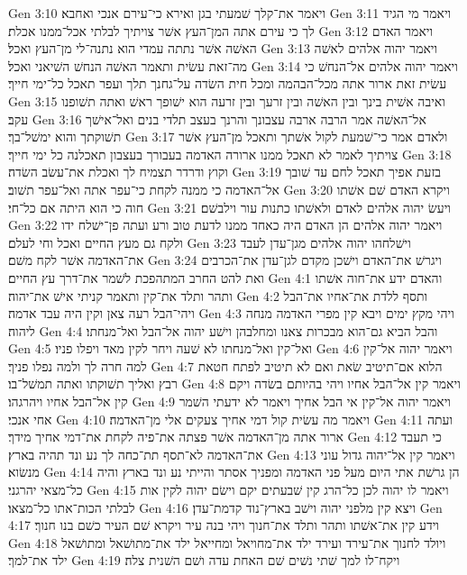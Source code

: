 Gen 3:10  ויאמר את־קלך שׁמעתי בגן ואירא כי־עירם אנכי ואחבא׃
Gen 3:11  ויאמר מי הגיד לך כי עירם אתה המן־העץ אשׁר צויתיך לבלתי אכל־ממנו אכלת׃
Gen 3:12  ויאמר האדם האשׁה אשׁר נתתה עמדי הוא נתנה־לי מן־העץ ואכל׃
Gen 3:13  ויאמר יהוה אלהים לאשׁה מה־זאת עשׂית ותאמר האשׁה הנחשׁ השׁיאני ואכל׃
Gen 3:14  ויאמר יהוה אלהים אל־הנחשׁ כי עשׂית זאת ארור אתה מכל־הבהמה ומכל חית השׂדה על־גחנך תלך ועפר תאכל כל־ימי חייך׃
Gen 3:15  ואיבה אשׁית בינך ובין האשׁה ובין זרעך ובין זרעה הוא ישׁופך ראשׁ ואתה תשׁופנו עקב׃
Gen 3:16  אל־האשׁה אמר הרבה ארבה עצבונך והרנך בעצב תלדי בנים ואל־אישׁך תשׁוקתך והוא ימשׁל־בך׃
Gen 3:17  ולאדם אמר כי־שׁמעת לקול אשׁתך ותאכל מן־העץ אשׁר צויתיך לאמר לא תאכל ממנו ארורה האדמה בעבורך בעצבון תאכלנה כל ימי חייך׃
Gen 3:18  וקוץ ודרדר תצמיח לך ואכלת את־עשׂב השׂדה׃
Gen 3:19  בזעת אפיך תאכל לחם עד שׁובך אל־האדמה כי ממנה לקחת כי־עפר אתה ואל־עפר תשׁוב׃
Gen 3:20  ויקרא האדם שׁם אשׁתו חוה כי הוא היתה אם כל־חי׃
Gen 3:21  ויעשׂ יהוה אלהים לאדם ולאשׁתו כתנות עור וילבשׁם׃
Gen 3:22  ויאמר יהוה אלהים הן האדם היה כאחד ממנו לדעת טוב ורע ועתה פן־ישׁלח ידו ולקח גם מעץ החיים ואכל וחי לעלם׃
Gen 3:23  וישׁלחהו יהוה אלהים מגן־עדן לעבד את־האדמה אשׁר לקח משׁם׃
Gen 3:24  ויגרשׁ את־האדם וישׁכן מקדם לגן־עדן את־הכרבים ואת להט החרב המתהפכת לשׁמר את־דרך עץ החיים׃
Gen 4:1  והאדם ידע את־חוה אשׁתו ותהר ותלד את־קין ותאמר קניתי אישׁ את־יהוה׃
Gen 4:2  ותסף ללדת את־אחיו את־הבל ויהי־הבל רעה צאן וקין היה עבד אדמה׃
Gen 4:3  ויהי מקץ ימים ויבא קין מפרי האדמה מנחה ליהוה׃
Gen 4:4  והבל הביא גם־הוא מבכרות צאנו ומחלבהן וישׁע יהוה אל־הבל ואל־מנחתו׃
Gen 4:5  ואל־קין ואל־מנחתו לא שׁעה ויחר לקין מאד ויפלו פניו׃
Gen 4:6  ויאמר יהוה אל־קין למה חרה לך ולמה נפלו פניך׃
Gen 4:7  הלוא אם־תיטיב שׂאת ואם לא תיטיב לפתח חטאת רבץ ואליך תשׁוקתו ואתה תמשׁל־בו׃
Gen 4:8  ויאמר קין אל־הבל אחיו ויהי בהיותם בשׂדה ויקם קין אל־הבל אחיו ויהרגהו׃
Gen 4:9  ויאמר יהוה אל־קין אי הבל אחיך ויאמר לא ידעתי השׁמר אחי אנכי׃
Gen 4:10  ויאמר מה עשׂית קול דמי אחיך צעקים אלי מן־האדמה׃
Gen 4:11  ועתה ארור אתה מן־האדמה אשׁר פצתה את־פיה לקחת את־דמי אחיך מידך׃
Gen 4:12  כי תעבד את־האדמה לא־תסף תת־כחה לך נע ונד תהיה בארץ׃
Gen 4:13  ויאמר קין אל־יהוה גדול עוני מנשׂוא׃
Gen 4:14  הן גרשׁת אתי היום מעל פני האדמה ומפניך אסתר והייתי נע ונד בארץ והיה כל־מצאי יהרגני׃
Gen 4:15  ויאמר לו יהוה לכן כל־הרג קין שׁבעתים יקם וישׂם יהוה לקין אות לבלתי הכות־אתו כל־מצאו׃
Gen 4:16  ויצא קין מלפני יהוה וישׁב בארץ־נוד קדמת־עדן׃
Gen 4:17  וידע קין את־אשׁתו ותהר ותלד את־חנוך ויהי בנה עיר ויקרא שׁם העיר כשׁם בנו חנוך׃
Gen 4:18  ויולד לחנוך את־עירד ועירד ילד את־מחויאל ומחייאל ילד את־מתושׁאל ומתושׁאל ילד את־למך׃
Gen 4:19  ויקח־לו למך שׁתי נשׁים שׁם האחת עדה ושׁם השׁנית צלה׃
